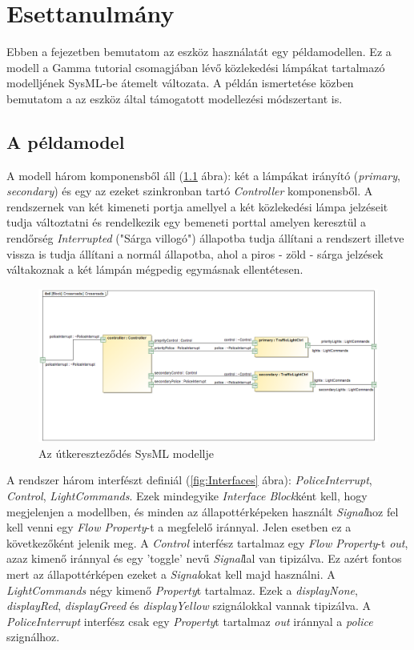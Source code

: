 \chapter{Esettanulmány}

Ebben a fejezetben bemutatom az eszköz használatát egy példamodellen. Ez a modell a Gamma tutorial csomagjában lévő közlekedési lámpákat tartalmazó modelljének SysML-be átemelt változata. A példán ismertetése közben bemutatom a az eszköz által támogatott modellezési módszertant is.

\section{A példamodel}

A modell három komponensből áll (\ref{fig:Crossroads} ábra): két a lámpákat irányító (\emph{primary}, \emph{secondary}) és egy az ezeket szinkronban tartó \emph{Controller} komponensből. A rendszernek van két kimeneti portja amellyel a két közlekedési lámpa jelzéseit tudja változtatni és rendelkezik egy bemeneti porttal amelyen keresztül a rendőrség \emph{Interrupted} ("Sárga villogó") állapotba tudja állítani a rendszert illetve vissza is tudja állítani a normál állapotba, ahol a piros - zöld - sárga jelzések váltakoznak a két lámpán mégpedig egymásnak ellentétesen.

\begin{figure}[!ht]
	\centering
	\includegraphics[width=15cm, keepaspectratio]{figures/contribution/Crossroads.png}
	\caption{Az útkereszteződés SysML modellje}
	\label{fig:Crossroads}
\end{figure}

A rendszer három interfészt definiál (\ref{fig:Interfaces} ábra): \emph{PoliceInterrupt}, \emph{Control}, \emph{LightCommands}. Ezek mindegyike \emph{Interface Block}ként kell, hogy megjelenjen a modellben, és minden az állapottérképeken használt \emph{Signal}hoz fel kell venni egy \emph{Flow Property}-t a megfelelő iránnyal. Jelen esetben ez a következőként jelenik meg. A \emph{Control} interfész tartalmaz egy \emph{Flow Property}-t \emph{out}, azaz kimenő iránnyal és egy 'toggle' nevű \emph{Signal}lal van tipizálva. Ez azért fontos mert az állapottérképen ezeket a \emph{Signal}okat kell majd használni. A \emph{LightCommands} négy kimenő \emph{Property}t tartalmaz. Ezek a \emph{displayNone}, \emph{displayRed}, \emph{displayGreed} és \emph{displayYellow} szignálokkal vannak tipizálva. A \emph{PoliceInterrupt} interfész csak egy \emph{Property}t tartalmaz \emph{out} iránnyal a \emph{police} szignálhoz.

